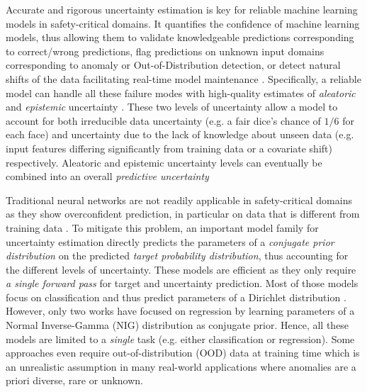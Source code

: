 Accurate and rigorous uncertainty estimation is key for reliable machine learning models in safety-critical domains. It quantifies the confidence of machine learning models, thus allowing them to validate knowledgeable predictions corresponding to correct/wrong predictions, flag predictions on unknown input domains corresponding to anomaly or Out-of-Distribution detection, or detect natural shifts of the data facilitating real-time model maintenance \citep{dataset-shift, shifts-dataset, comparison-bayesian-diabetic}. Specifically, a reliable model can handle all these failure modes with high-quality estimates of \emph{aleatoric} and \emph{epistemic} uncertainty \citep{uncertainty-deep-learning}. These two levels of uncertainty allow a model to account for both irreducible data uncertainty (e.g. a fair dice's chance of $1/6$ for each face) and uncertainty due to the lack of knowledge about unseen data (e.g. input features differing significantly from training data or a covariate shift) respectively. Aleatoric and epistemic uncertainty levels can eventually be combined into an overall \emph{predictive uncertainty} \citep{uncertainty-deep-learning}

Traditional neural networks are not readily applicable in safety-critical domains as they show overconfident prediction, in particular on data that is different from training data \citep{calibration-network, ensembles}. To mitigate this problem, an important model family for uncertainty estimation directly predicts the parameters of a \emph{conjugate prior distribution} on the predicted \emph{target probability distribution}, thus accounting for the different levels of uncertainty. These models are efficient as they only require \emph{a single forward pass} for target and uncertainty prediction. Most of those models focus on classification and thus predict parameters of a Dirichlet distribution \citep{uceloss,postnet,priornet,reverse-kl,max_gap_id_ood,uncertainty-generative-classifier,multifaceted_uncertainty,graph_posterior,graph_uncertainty, lightweight-prob-net}. However, only two works \citep{evidential-regression, regression-priornet} have focused on regression by learning parameters of a Normal Inverse-Gamma (NIG) distribution as conjugate prior. Hence, all these models are limited to a \emph{single} task (e.g. either classification or regression). Some approaches even require out-of-distribution (OOD) data at training time \citep{priornet, reverse-kl} which is an unrealistic assumption in many real-world applications where anomalies are a priori diverse, rare or unknown.

